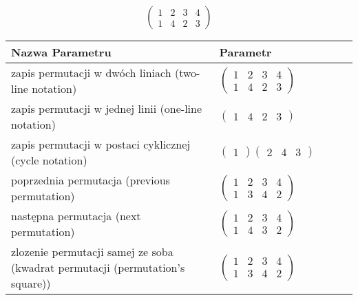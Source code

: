 \documentclass[12pt]{article}
\begin{document}
\subsection{}
\begin{center}
\[
\begin{pmatrix}
	1 & 2 & 3 & 4 \\ 
	1 & 4 & 2 & 3 
\end{pmatrix}
\]

\begin{tabular}{|m{0.6\linewidth}|m{0.4\linewidth}|}
	\hline
	Nazwa Parametru & Parametr \\
	\hline
	zapis permutacji w dwóch liniach (two-line notation) & $\begin{pmatrix} 1 & 2 & 3 & 4 \\ 
1 & 4 & 2 & 3 \end{pmatrix}$ \\ 
	\hline
	zapis permutacji w jednej linii (one-line notation) & $\begin{pmatrix} 1 & 4 & 2 & 3 \end{pmatrix}$ \\ 
	\hline
	zapis permutacji w postaci cyklicznej (cycle notation) & $\begin{pmatrix} 1 \end{pmatrix} \begin{pmatrix} 2 & 4 & 3 \end{pmatrix} $ \\ 
	\hline
	poprzednia permutacja (previous permutation) & $\begin{pmatrix} 1 & 2 & 3 & 4 \\ 
1 & 3 & 4 & 2 \end{pmatrix}$ \\ 
	\hline
	następna permutacja (next permutation) & $\begin{pmatrix} 1 & 2 & 3 & 4 \\ 
1 & 4 & 3 & 2 \end{pmatrix}$ \\ 
	\hline
	zlozenie permutacji samej ze soba (kwadrat permutacji (permutation's square)) & $\begin{pmatrix} 1 & 2 & 3 & 4 \\ 
1 & 3 & 4 & 2 \end{pmatrix}$ \\ 
	\hline
\end{tabular}
\end{center}
\end{document}

